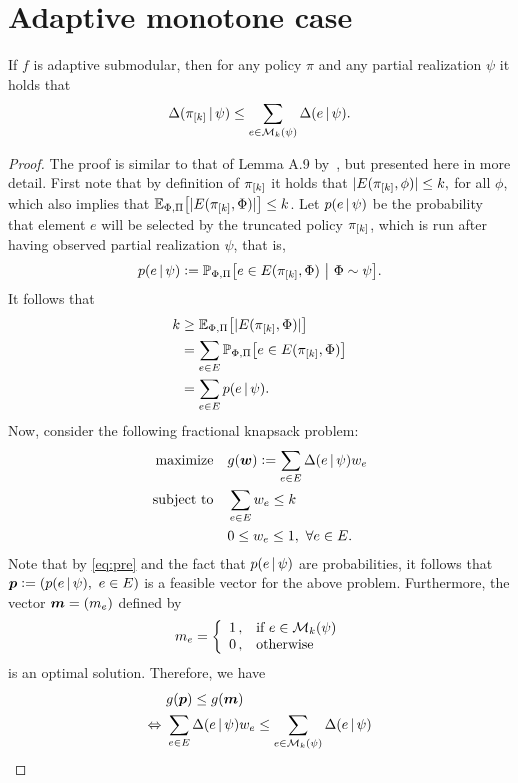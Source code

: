 \section{Adaptive monotone case}

\begin{lemma}\label{lem:submod}
  If $f$ is adaptive submodular, then for any policy $\pi$ and any partial realization $\psi$ it holds that
  \begin{align*}
    \Delta(\pi_{[k]}\,\vert\,\psi) \leq \sum_{e \in \mathcal{M}_k(\psi)} \Delta(e\,\vert\,\psi).
  \end{align*}
\end{lemma}
\begin{proof}
  The proof is similar to that of Lemma A.9 by~\citet{golovin11}, but presented here in more detail.
  First note that by definition of $\pi_{[k]}$ it holds that $|E(\pi_{[k]}, \phi)| \leq k,$ for all $\phi$, which also implies that $\E[\Phi,\Pi]{|E(\pik, \Phi)|} \leq k$.
  Let $p(e\,\vert\,\psi)$ be the probability that element $e$ will be selected by the truncated policy $\pi_{[k]}$, which is run after having observed partial realization $\psi$, that is,
  \begin{align*}
    p(e\mmid\psi) \defeq \P[\Phi,\Pi]{e \in E(\pik, \Phi)}[\Phi \sim \psi].
  \end{align*}
  It follows that
  \begin{align}
    \label{eq:pre}
    \begin{split}
      k &\geq \E[\Phi, \Pi]{|E(\pik, \Phi)|}\\
        &= \sum_{e \in E}\P[\Phi,\Pi]{e \in E(\pik, \Phi)}\\
        &= \sum_{e \in E}p(e\mmid\psi).
    \end{split}
  \end{align}
  Now, consider the following fractional knapsack problem:
  \begin{align*}
    \textrm{maximize} & \quad g(\bm{w}) \vcentcolon= \sum_{e \in E}\Delta(e\,\vert\,\psi)w_e\\
    \textrm{subject to} & \quad \sum_{e \in E}w_e \leq k\\
               & \quad 0 \leq w_e \leq 1,\ \forall e \in E.
  \end{align*}
  Note that by \eqref{eq:pre} and the fact that $p(e\,\vert\,\psi)$ are probabilities, it follows that $\*p \defeq \left(p(e\mmid\psi),\ e \in E\right)$ is a feasible vector for the above problem.
  Furthermore, the vector $\bm{m} = (m_e)$ defined by
  \begin{align*}
    m_e = \twopartdefo{1}{e \in \mathcal{M}_k(\psi)}{0}
  \end{align*}
  is an optimal solution. 
  Therefore, we have
  \begin{align}\label{eq:knap}
                    &\ g(\bm{p}) \leq g(\bm{m}) \notag\\
    \Leftrightarrow &\ \sum_{e \in E}\Delta(e\,\vert\,\psi)w_e \leq \sum_{e \in \mathcal{M}_k(\psi)} \Delta(e\,\vert\,\psi)
  \end{align}
  

\end{proof}
